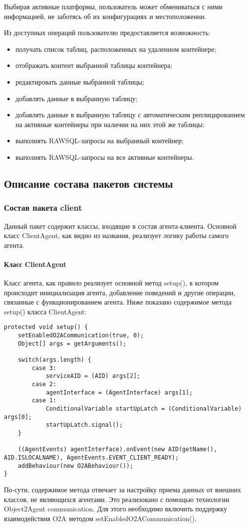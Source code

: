 Выбирая активные платформы, пользователь может обмениваться с ними информацией, не заботясь об их конфигурациях и местоположении.

Из доступных операций пользователю предоставляется возможность:
\begin{itemize}
\item получать список таблиц, расположенных на удаленном контейнере;
\item отображать контент выбранной таблицы контейнера;
\item редактировать данные выбранной таблицы;
\item добавлять данные в выбранную таблицу;
\item добавлять данные в выбранную таблицу с автоматическим реплицированием на активные контейнеры при наличии на них этой же таблицы;
\item выполнять RAWSQL-запросы на выбранный контейнер;
\item выполнять RAWSQL-запросы на все активные контейнеры.
\end{itemize}

\subsection{Описание состава пакетов системы}
\subsubsection{Состав пакета client}
Данный пакет содержит классы, входящие в состав агента-клиента. Основной класс ClientAgent, как видно из названия, реализует логику работы самого агента.

\paragraph{Класс ClientAgent}
Класс агента, как правило реализует основной метод setup(), в котором происходит инициализация агента, добавление поведений и другие операции, связанные с функционированием агента.
Ниже показано содержимое метода setup() класса ClientAgent:
\begin{verbatim}
protected void setup() {
    setEnabledO2ACommunication(true, 0);
    Object[] args = getArguments();

    switch(args.length) {
        case 3:
            serviceAID = (AID) args[2];
        case 2:
            agentInterface = (AgentInterface) args[1];
        case 1:
            ConditionalVariable startUpLatch = (ConditionalVariable) args[0];
            startUpLatch.signal();
    }

    ((AgentEvents) agentInterface).onEvent(new AID(getName(), AID.ISLOCALNAME), AgentEvents.EVENT_CLIENT_READY);
    addBehaviour(new O2ABehaviour());
}
\end{verbatim}
По-сути, содержимое метода отвечает за настройку приема данных от внешних классов, не являющихся агентами. Это реализовано с помощью технологии Object2Agent communication. Для этого необходимо включить поддержку взаимодействия O2A методом setEnabledO2ACommunication().


